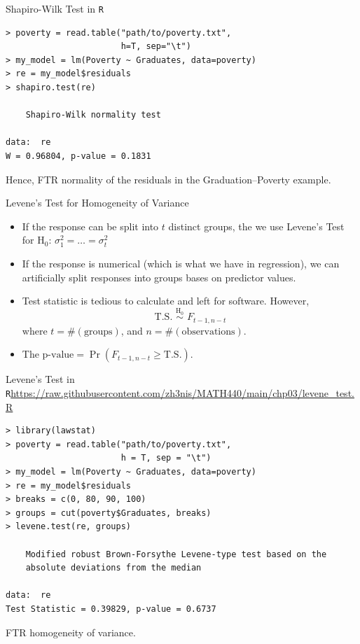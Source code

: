 \documentclass{beamer}
\begin{document}
\begin{frame}[fragile]{Shapiro-Wilk Test in \texttt{R}}
\begin{verbatim}
> poverty = read.table("path/to/poverty.txt", 
                       h=T, sep="\t")
> my_model = lm(Poverty ~ Graduates, data=poverty)
> re = my_model$residuals
> shapiro.test(re)

	Shapiro-Wilk normality test

data:  re
W = 0.96804, p-value = 0.1831    
\end{verbatim}
\pause Hence, FTR normality of the residuals in the Graduation--Poverty example.
\end{frame}

\begin{frame}{Levene's Test for Homogeneity of Variance}
\begin{itemize}
    \item If the response can be split into $t$ distinct groups, the we use Levene's Test for
    $\mathrm{H}_0:\,\sigma^2_1=\ldots=\sigma^2_t$
    \item<2-> If the response is numerical (which is what we have in regression), we can artificially split responses into groups bases on predictor values.
    \item<3-> Test statistic is tedious to calculate and left for software. However,
    $$
    \text{T.S.}\,\,{\stackrel{\mathrm{H}_0}{\sim}}\,\,F_{t-1,n-t}
    $$
    where $t=\#(\text{groups})$, and $n=\#(\text{observations})$. 
    \item<4->The $\text{p-value}=\Pr(F_{t-1,n-t}\ge \text{T.S.})$.
\end{itemize}    
\end{frame}

\begin{frame}[fragile]{Levene's Test in \texttt{R}}{\url{https://raw.githubusercontent.com/zh3nis/MATH440/main/chp03/levene_test.R}}
\begin{small}
\begin{verbatim}
> library(lawstat)
> poverty = read.table("path/to/poverty.txt", 
                       h = T, sep = "\t")
> my_model = lm(Poverty ~ Graduates, data=poverty)
> re = my_model$residuals
> breaks = c(0, 80, 90, 100)
> groups = cut(poverty$Graduates, breaks)
> levene.test(re, groups)

	Modified robust Brown-Forsythe Levene-type test based on the 
	absolute deviations from the median

data:  re
Test Statistic = 0.39829, p-value = 0.6737
\end{verbatim}
\end{small}
\pause FTR homogeneity of variance.
\end{frame}
\end{document}
